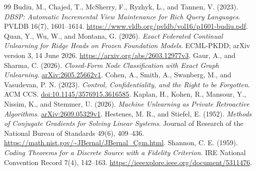 \documentclass[11pt,a4paper]{article}
\theoremstyle{definition}\newtheorem{definition}[theorem]{Definition}
\begin{document}
\begin{thebibliography}{99}
 Budiu, M., Chajed, T., McSherry, F., Ryzhyk, L., and Tannen, V. (2023). \emph{DBSP: Automatic Incremental View Maintenance for Rich Query Languages}. PVLDB 16(7), 1601--1614. \url{https://www.vldb.org/pvldb/vol16/p1601-budiu.pdf}.
 Quan, Y., Wu, W., and Montana, G. (2026). \emph{Exact Federated Continual Unlearning for Ridge Heads on Frozen Foundation Models}. ECML-PKDD; arXiv version 3, 14 June 2026. \url{https://arxiv.org/abs/2603.12977v3}.
 Gaur, A., and Sharma, C. (2026). \emph{Closed-Form Node Classification with Exact Graph Unlearning}. \href{https://arxiv.org/abs/2605.25662v1}{arXiv:2605.25662v1}.
 Cohen, A., Smith, A., Swanberg, M., and Vasudevan, P. N. (2023). \emph{Control, Confidentiality, and the Right to be Forgotten}. ACM CCS. \href{https://doi.org/10.1145/3576915.3616585}{doi:10.1145/3576915.3616585}.
 Kaplan, H., Kohen, R., Mansour, Y., Nissim, K., and Stemmer, U. (2026). \emph{Machine Unlearning as Private Retroactive Algorithms}. \href{https://arxiv.org/abs/2609.05329v1}{arXiv:2609.05329v1}.
 Hestenes, M. R., and Stiefel, E. (1952). \emph{Methods of Conjugate Gradients for Solving Linear Systems}. Journal of Research of the National Bureau of Standards 49(6), 409--436. \url{https://math.nist.gov/~JBernal/JBernal_Cgm.html}.
 Shannon, C. E. (1959). \emph{Coding Theorems for a Discrete Source with a Fidelity Criterion}. IRE National Convention Record 7(4), 142--163. \url{https://ieeexplore.ieee.org/document/5311476}.
\end{thebibliography}
\end{document}
